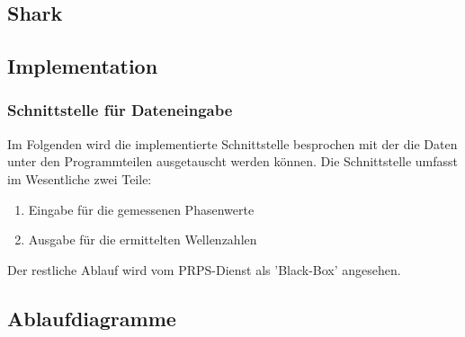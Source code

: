 \lipsum[1-2]
%
\subsection{Shark}
\label{sec:Shark}

%
\subsection{Implementation}
\lipsum[1-3]
%
\subsubsection{Schnittstelle für Dateneingabe}
Im Folgenden wird die implementierte Schnittstelle besprochen mit der die Daten unter den Programmteilen ausgetauscht werden können. Die Schnittstelle umfasst im Wesentliche zwei Teile:
\begin{enumerate}
	\item Eingabe für die gemessenen Phasenwerte
	\item Ausgabe für die ermittelten Wellenzahlen
\end{enumerate}
%
Der restliche Ablauf wird vom PRPS-Dienst als 'Black-Box' angesehen.\\
%
%
\subsection{Ablaufdiagramme}
%

%

%


\lipsum[1-5]